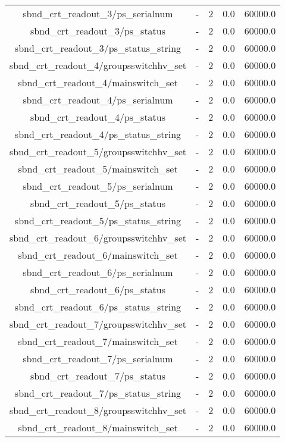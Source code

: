 \begin{center}
\begin{longtable}{c | c c c c }
sbnd\_crt\_readout\_3/ps\_serialnum & - & 2 & 0.0 & 60000.0\\ 
sbnd\_crt\_readout\_3/ps\_status & - & 2 & 0.0 & 60000.0\\ 
sbnd\_crt\_readout\_3/ps\_status\_string & - & 2 & 0.0 & 60000.0\\ 
sbnd\_crt\_readout\_4/groupsswitchhv\_set & - & 2 & 0.0 & 60000.0\\ 
sbnd\_crt\_readout\_4/mainswitch\_set & - & 2 & 0.0 & 60000.0\\ 
sbnd\_crt\_readout\_4/ps\_serialnum & - & 2 & 0.0 & 60000.0\\ 
sbnd\_crt\_readout\_4/ps\_status & - & 2 & 0.0 & 60000.0\\ 
sbnd\_crt\_readout\_4/ps\_status\_string & - & 2 & 0.0 & 60000.0\\ 
sbnd\_crt\_readout\_5/groupsswitchhv\_set & - & 2 & 0.0 & 60000.0\\ 
sbnd\_crt\_readout\_5/mainswitch\_set & - & 2 & 0.0 & 60000.0\\ 
sbnd\_crt\_readout\_5/ps\_serialnum & - & 2 & 0.0 & 60000.0\\ 
sbnd\_crt\_readout\_5/ps\_status & - & 2 & 0.0 & 60000.0\\ 
sbnd\_crt\_readout\_5/ps\_status\_string & - & 2 & 0.0 & 60000.0\\ 
sbnd\_crt\_readout\_6/groupsswitchhv\_set & - & 2 & 0.0 & 60000.0\\ 
sbnd\_crt\_readout\_6/mainswitch\_set & - & 2 & 0.0 & 60000.0\\ 
sbnd\_crt\_readout\_6/ps\_serialnum & - & 2 & 0.0 & 60000.0\\ 
sbnd\_crt\_readout\_6/ps\_status & - & 2 & 0.0 & 60000.0\\ 
sbnd\_crt\_readout\_6/ps\_status\_string & - & 2 & 0.0 & 60000.0\\ 
sbnd\_crt\_readout\_7/groupsswitchhv\_set & - & 2 & 0.0 & 60000.0\\ 
sbnd\_crt\_readout\_7/mainswitch\_set & - & 2 & 0.0 & 60000.0\\ 
sbnd\_crt\_readout\_7/ps\_serialnum & - & 2 & 0.0 & 60000.0\\ 
sbnd\_crt\_readout\_7/ps\_status & - & 2 & 0.0 & 60000.0\\ 
sbnd\_crt\_readout\_7/ps\_status\_string & - & 2 & 0.0 & 60000.0\\ 
sbnd\_crt\_readout\_8/groupsswitchhv\_set & - & 2 & 0.0 & 60000.0\\ 
sbnd\_crt\_readout\_8/mainswitch\_set & - & 2 & 0.0 & 60000.0\\ 

\end{longtable}
\end{center}
